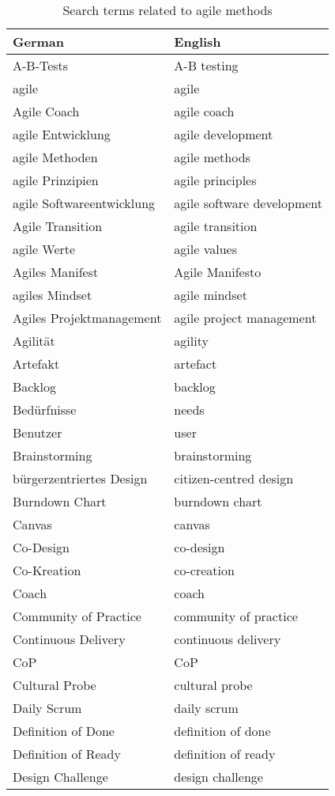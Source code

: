 \documentclass[a4paper]{article}
\begin{document}
\begin{longtable}{ p{5cm} p{5cm}}
	\caption{Search terms related to agile methods}\label{tab: search terms related to agile methods}\\
\hline
German & English\\
\hline
A-B-Tests	&	A-B testing\\
agile	&	agile\\
Agile Coach	&	agile coach\\
agile Entwicklung	&	agile development\\
agile Methoden	&	agile methods\\
agile Prinzipien	&	agile principles\\
agile Softwareentwicklung	&	agile software development\\
Agile Transition	&	agile transition\\
agile Werte	&	agile values\\
Agiles Manifest	&	Agile Manifesto\\
agiles Mindset	&	agile mindset\\
Agiles Projektmanagement	&	agile project management\\
Agilität	&	agility\\
Artefakt	&	artefact\\
Backlog	&	backlog\\
Bedürfnisse	&	needs\\
Benutzer	&	user\\
Brainstorming	&	brainstorming\\
bürgerzentriertes Design	&	citizen-centred design\\
Burndown Chart	&	burndown chart\\
Canvas	&	canvas\\
Co-Design	&	co-design\\
Co-Kreation	&	co-creation\\
Coach	&	coach\\
Community of Practice	&	community of practice\\
Continuous Delivery	&	continuous delivery\\
CoP	&	CoP\\
Cultural Probe	&	cultural probe\\
Daily Scrum	&	daily scrum\\
Definition of Done	&	definition of done\\
Definition of Ready	&	definition of ready\\
Design Challenge	&	design challenge\\

\end{longtable}
\end{document}
